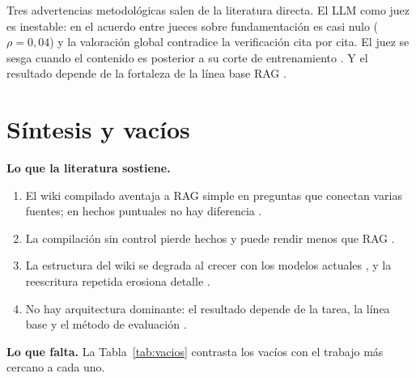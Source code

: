 \documentclass[11pt,letterpaper]{article}
\begin{document}
Tres advertencias metodológicas salen de la literatura directa. El LLM como juez es inestable: en \citet{cochran2026rag} el acuerdo entre jueces sobre fundamentación es casi nulo ($\rho = 0{,}04$) y la valoración global contradice la verificación cita por cita. El juez se sesga cuando el contenido es posterior a su corte de entrenamiento \citep{huerta2026streaming}. Y el resultado depende de la fortaleza de la línea base RAG \citep{cochran2026rag,zhang2026pilot}.

\section{Síntesis y vacíos}

\textbf{Lo que la literatura sostiene.}
\begin{enumerate}
\item El wiki compilado aventaja a RAG simple en preguntas que conectan varias fuentes; en hechos puntuales no hay diferencia \citep{wright2026,cochran2026rag,ming2026llmwiki}.
\item La compilación sin control pierde hechos y puede rendir menos que RAG \citep{huerta2026wicer,zhang2026pilot}.
\item La estructura del wiki se degrada al crecer con los modelos actuales \citep{zhou2026}, y la reescritura repetida erosiona detalle \citep{zhang2025ace}.
\item No hay arquitectura dominante: el resultado depende de la tarea, la línea base y el método de evaluación \citep{han2025,cochran2026rag}.
\end{enumerate}

\textbf{Lo que falta.} La Tabla~\ref{tab:vacios} contrasta los vacíos con el trabajo más cercano a cada uno.
\end{document}
